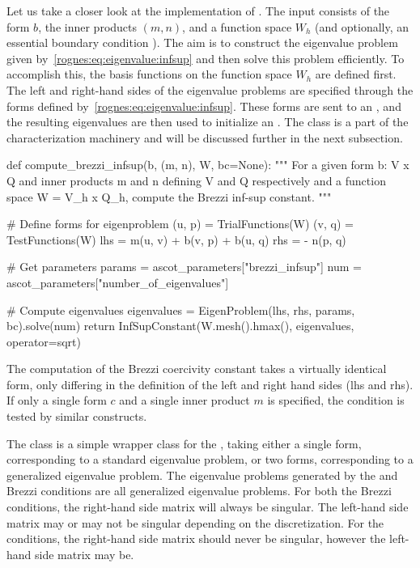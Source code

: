 Let us take a closer look at the implementation
of . The input consists of
the form $b$, the inner products $(m, n)$, and a function space $W_h$
(and optionally, an essential boundary
condition ). The aim is to construct the
eigenvalue problem given by~\eqref{rognes:eq:eigenvalue:infsup} and
then solve this problem efficiently. To accomplish this, the basis
functions on the function space $W_h$ are defined first. The left and
right-hand sides of the eigenvalue problems are specified through the
forms defined by~\eqref{rognes:eq:eigenvalue:infsup}. These forms are
sent to an
, and the resulting eigenvalues are then
used to initialize an . The
 class is a part of the
characterization machinery and will be discussed further in the next
subsection.
\begin{python}
def compute_brezzi_infsup(b, (m, n), W, bc=None):
    """
    For a given form b: V x Q \rightarrow \R and inner products m and
    n defining V and Q respectively and a function space W = V_h x
    Q_h, compute the Brezzi inf-sup constant.
    """

    # Define forms for eigenproblem
    (u, p) = TrialFunctions(W)
    (v, q) = TestFunctions(W)
    lhs = m(u, v) + b(v, p) + b(u, q)
    rhs = - n(p, q)

    # Get parameters
    params = ascot_parameters["brezzi_infsup"]
    num = ascot_parameters["number_of_eigenvalues"]

    # Compute eigenvalues
    eigenvalues = EigenProblem(lhs, rhs, params, bc).solve(num)
    return InfSupConstant(W.mesh().hmax(), eigenvalues, operator=sqrt)
\end{python}
The computation of the Brezzi coercivity constant takes a
virtually identical form, only differing in the definition of the left
and right hand sides (lhs and rhs). If only a single form $c$ and a
single inner product $m$ is specified, the \babuska{} condition is
tested by similar constructs.

The  class is a simple wrapper class for the
\dolfin{} , taking either a single form,
corresponding to a standard eigenvalue problem, or two forms,
corresponding to a generalized eigenvalue problem. The eigenvalue
problems generated by the \babuska{} and Brezzi conditions are all
generalized eigenvalue problems. For both the Brezzi conditions, the
right-hand side matrix will always be singular. The left-hand side
matrix may or may not be singular depending on the discretization. For
the \babuska{} conditions, the right-hand side matrix should never be
singular, however the left-hand side matrix may be.

